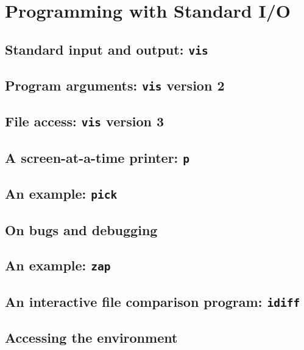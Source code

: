 \chapter{Programming with Standard I/O}
\label{chap:programming_with_standard_io}
\section{Standard input and output: \texttt{vis}}
\section{Program arguments: \texttt{vis} version 2}
\section{File access: \texttt{vis} version 3}
\section{A screen-at-a-time printer: \texttt{p}}
\section{An example: \texttt{pick}}
\section{On bugs and debugging}
\section{An example: \texttt{zap}}
\section{An interactive file comparison program: \texttt{idiff}}
\section{Accessing the environment}
